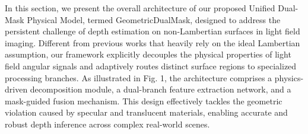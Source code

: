 \documentclass[lettersize,journal]{IEEEtran}
\begin{document}
\begin{table}[!t]
\centering
\caption{Summary of Key Hyperparameters and Implementation Settings}
\label{tab:hyperparameters}
\renewcommand{\arraystretch}{1.3}
\end{table}


In this section, we present the overall architecture of our proposed Unified Dual-Mask Physical Model, termed GeometricDualMask, designed to address the persistent challenge of depth estimation on non-Lambertian surfaces in light field imaging. Different from previous works that heavily rely on the ideal Lambertian assumption, our framework explicitly decouples the physical properties of light field angular signals and adaptively routes distinct surface regions to specialized processing branches. As illustrated in Fig. 1, the architecture comprises a physics-driven decomposition module, a dual-branch feature extraction network, and a mask-guided fusion mechanism. This design effectively tackles the geometric violation caused by specular and translucent materials, enabling accurate and robust depth inference across complex real-world scenes.
\end{document}
